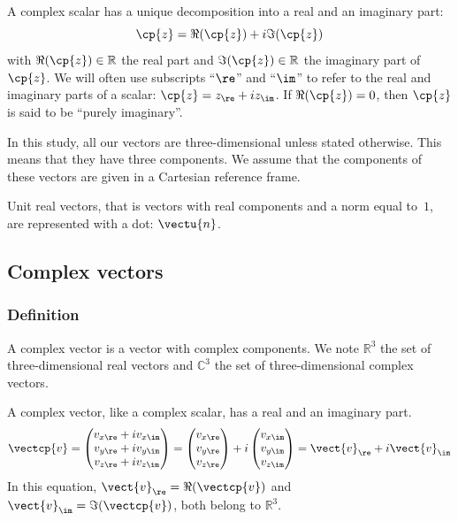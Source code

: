 A complex scalar has a unique decomposition into a real and an imaginary part:
\begin{equation}
    \cp{z} = \Re(\cp{z}) + i \Im(\cp{z})
\end{equation}
with $\Re(\cp{z}) \in \mathbb{R}$ the real part and $\Im(\cp{z}) \in \mathbb{R}$ the imaginary part of $\cp{z}$.
We will often use subscripts ``$\re$'' and ``$\im$'' to refer to the real and imaginary parts of a scalar: $\cp{z} = z_\re + i z_\im$.
If $\Re(\cp{z})=0$, then $\cp{z}$ is said to be ``purely imaginary''.

In this study, all our vectors are three-dimensional unless stated otherwise.
This means that they have three components.
We assume that the components of these vectors are given in a Cartesian reference frame.

Unit real vectors, that is vectors with real components and a norm equal to~$1$, are represented with a dot: $\vectu{n}$.





\subsection{Complex vectors}

\subsubsection{Definition}
A complex vector is a vector with complex components.
We note
$\mathbb{R}^3$ the set of three-dimensional real vectors and
$\mathbb{C}^3$ the set of three-dimensional complex vectors.

A complex vector, like a complex scalar, has a real and an imaginary part.
\begin{equation}
    \vectcp{v}
    =
    \begin{pmatrix}
        v_{x\re} + i v_{x\im}\\
        v_{y\re} + i v_{y\im}\\
        v_{z\re} + i v_{z\im}
    \end{pmatrix}
    =
    \begin{pmatrix}
        v_{x\re}\\
        v_{y\re}\\
        v_{z\re}
    \end{pmatrix}
    +
    i
    \begin{pmatrix}
        v_{x\im}\\
        v_{y\im}\\
        v_{z\im}
    \end{pmatrix}
    =
    \vect{v}_\re + i \vect{v}_\im
\end{equation}
In this equation, $\vect{v}_\re = \Re(\vectcp{v})$ and $\vect{v}_\im = \Im(\vectcp{v})$,
both belong to $\mathbb{R}^3$.


